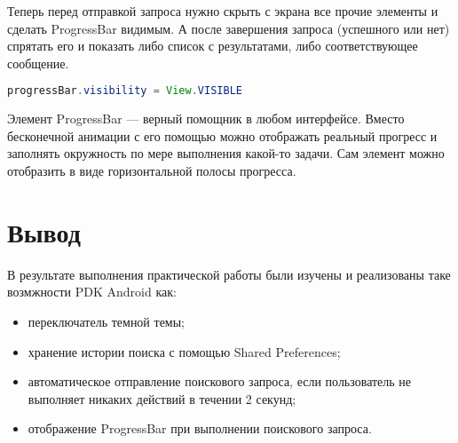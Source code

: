 Теперь перед отправкой запроса нужно скрыть с экрана все прочие элементы
и сделать ProgressBar видимым. А после завершения запроса (успешного или
нет) спрятать его и показать либо список с результатами, либо
соответствующее сообщение.

\begin{lstlisting}[language=Java]
progressBar.visibility = View.VISIBLE
\end{lstlisting}

Элемент ProgressBar --- верный помощник в любом интерфейсе. Вместо
бесконечной анимации с его помощью можно отображать реальный прогресс
и заполнять окружность по мере выполнения какой-то задачи. Сам элемент
можно отобразить в виде горизонтальной полосы прогресса.

\clearpage

\section*{\LARGE Вывод}

В результате выполнения практической работы были
изучены и реализованы таке возмжности PDK Android как:

\begin{itemize}
	\item переключатель темной темы;
	\item хранение истории поиска с помощью Shared Preferences;
	\item автоматическое отправление поискового запроса,
		если пользователь не выполняет никаких действий в течении 2 секунд;
	\item отображение ProgressBar при выполнении поискового запроса.
\end{itemize}

